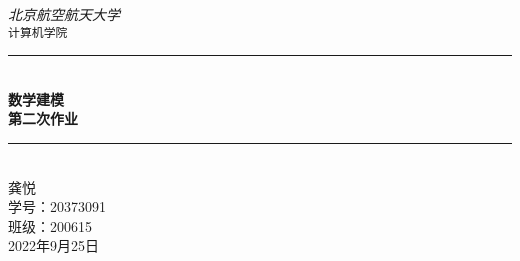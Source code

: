 \documentclass[fontset=fandol]{ctexrep}
\newcommand{\artdate}{2022年9月25日}
\begin{document}
 
 \begin{titlepage}
 
     \newcommand{\HRule}{\rule{\linewidth}{0.5mm}}
   
     \vfill
     \center 
     
     \textit{\Large 北京航空航天大学}\\[0.5cm] 
     \texttt{\Large 计算机学院}
   
     \vspace{3 cm}
     \HRule \\[0.4cm]
     { \huge \bfseries 数学建模}\\[0.4cm]
     { \huge \bfseries 第二次作业}\\
     \HRule \\[1cm]
 
     \vspace{2.5 cm}
     龚悦\\
     学号：20373091\\
     班级：200615\\
 
     \vspace{1 cm}
     {\large \artdate}\\[3cm] 
   
   \vfill
   
 \end{titlepage}

 \tableofcontents
 
 \appendix

  
 
\end{document}
